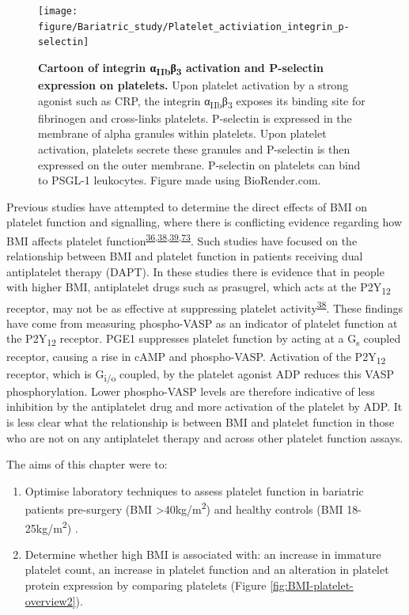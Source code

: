 \documentclass[11pt,twoside]{bristolthesis}
\providecommand{\tightlist}{%
  \setlength{\itemsep}{0pt}\setlength{\parskip}{0pt}}
\begin{document}
\begin{figure}
\texttt{[image: figure/Bariatric\_study/Platelet\_activiation\_integrin\_p-selectin]} \caption[Cartoon of integrin α\textsubscript{IIb}β\textsubscript{3} and P-selectin on platelets.]{\textbf{Cartoon of integrin α\textsubscript{IIb}β\textsubscript{3} activation and P-selectin expression on platelets.} Upon platelet activation by a strong agonist such as CRP, the integrin α\textsubscript{IIb}β\textsubscript{3} exposes its binding site for fibrinogen and cross-links platelets. P-selectin is expressed in the membrane of alpha granules within platelets. Upon platelet activation, platelets secrete these granules and P-selectin is then expressed on the outer membrane. P-selectin on platelets can bind to PSGL-1 leukocytes. Figure made using BioRender.com.}\label{fig:platelet-activation-2}
\end{figure}
Previous studies have attempted to determine the direct effects of BMI on platelet function and signalling, where there is conflicting evidence regarding how BMI affects platelet function\textsuperscript{\protect\hyperlink{ref-Nardin2015}{36},\protect\hyperlink{ref-Deharo2014}{38},\protect\hyperlink{ref-Sibbing2007}{39},\protect\hyperlink{ref-Barrachina2019}{73}}. Such studies have focused on the relationship between BMI and platelet function in patients receiving dual antiplatelet therapy (DAPT). In these studies there is evidence that in people with higher BMI, antiplatelet drugs such as prasugrel, which acts at the P2Y\textsubscript{12} receptor, may not be as effective at suppressing platelet activity\textsuperscript{\protect\hyperlink{ref-Deharo2014}{38}}. These findings have come from measuring phospho-VASP as an indicator of platelet function at the P2Y\textsubscript{12} receptor. PGE1 suppresses platelet function by acting at a G\textsubscript{s} coupled receptor, causing a rise in cAMP and phospho-VASP. Activation of the P2Y\textsubscript{12} receptor, which is G\textsubscript{i/o} coupled, by the platelet agonist ADP reduces this VASP phosphorylation. Lower phospho-VASP levels are therefore indicative of less inhibition by the antiplatelet drug and more activation of the platelet by ADP. It is less clear what the relationship is between BMI and platelet function in those who are not on any antiplatelet therapy and across other platelet function assays.

The aims of this chapter were to:
\begin{enumerate}
\def\labelenumi{\arabic{enumi})}
\tightlist
\item
  Optimise laboratory techniques to assess platelet function in bariatric patients pre-surgery (BMI \textgreater40kg/m\textsuperscript{2}) and healthy controls (BMI 18-25kg/m\textsuperscript{2}) .
\item
  Determine whether high BMI is associated with: an increase in immature platelet count, an increase in platelet function and an alteration in platelet protein expression by comparing platelets (Figure \ref{fig:BMI-platelet-overview2}).
\end{enumerate}
\end{document}
